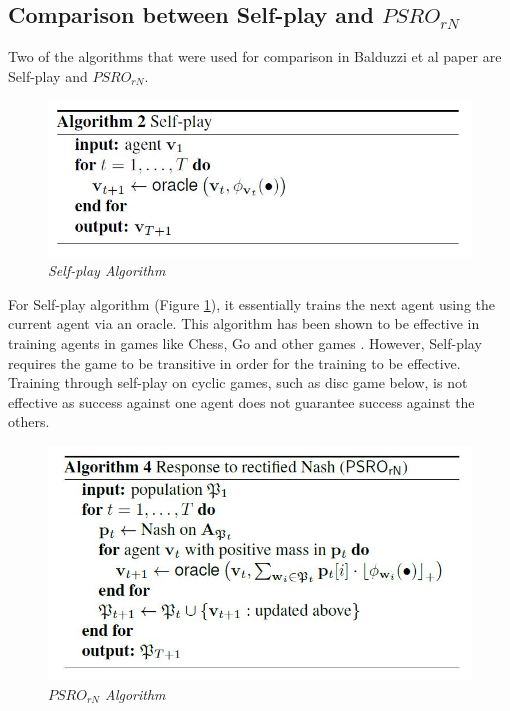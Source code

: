\documentclass{article}
\begin{document}
\subsection{Comparison between Self-play and $PSRO_{rN}$}

Two of the algorithms that were used for comparison in Balduzzi et al paper \cite{Balduzzi2019OpenendedLI} are Self-play and $PSRO_{rN}$.

\begin{figure}[!ht]
	\centering
	\includegraphics[scale=0.5]{SelfPlay}
	\caption{\textit{Self-play Algorithm}}
	\label{fig:sp_algo}
\end{figure}

For Self-play algorithm (Figure \ref{fig:sp_algo}), it essentially trains the next agent using the current agent via an oracle. This algorithm has been shown to be effective in training agents in games like Chess, Go and other games \cite{silver2018general}. However, Self-play requires the game to be transitive in order for the training to be effective. Training through self-play on cyclic games, such as disc game below, is not effective as success against one agent does not guarantee success against the others. 

\begin{figure}[!ht]
	\centering
	\includegraphics[scale=0.5]{PSRO_rN}
	\caption{\textit{$PSRO_{rN}$ Algorithm}}
	\label{fig:psro_algo}
\end{figure}
\end{document}
